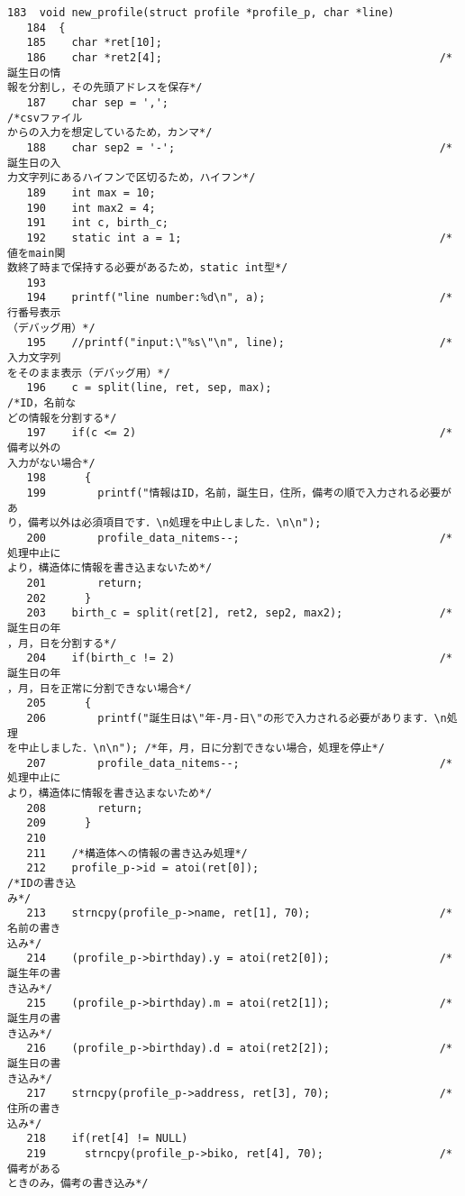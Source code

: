 \begin{Verbatim}[fontsize=\small, baselinestretch=0.8]
   183	void new_profile(struct profile *profile_p, char *line)
   184	{
   185	  char *ret[10];
   186	  char *ret2[4];                                           /*誕生日の情
報を分割し，その先頭アドレスを保存*/
   187	  char sep = ',';                                          /*csvファイル
からの入力を想定しているため，カンマ*/
   188	  char sep2 = '-';                                         /*誕生日の入
力文字列にあるハイフンで区切るため，ハイフン*/
   189	  int max = 10;
   190	  int max2 = 4;
   191	  int c, birth_c;
   192	  static int a = 1;                                        /*値をmain関
数終了時まで保持する必要があるため，static int型*/
   193	  
   194	  printf("line number:%d\n", a);                           /*行番号表示
（デバッグ用）*/
   195	  //printf("input:\"%s\"\n", line);                        /*入力文字列
をそのまま表示（デバッグ用）*/
   196	  c = split(line, ret, sep, max);                          /*ID，名前な
どの情報を分割する*/
   197	  if(c <= 2)                                               /*備考以外の
入力がない場合*/
   198	    {
   199	      printf("情報はID，名前，誕生日，住所，備考の順で入力される必要があ
り，備考以外は必須項目です．\n処理を中止しました．\n\n");
   200	      profile_data_nitems--;                               /*処理中止に
より，構造体に情報を書き込まないため*/
   201	      return;
   202	    }
   203	  birth_c = split(ret[2], ret2, sep2, max2);               /*誕生日の年
，月，日を分割する*/
   204	  if(birth_c != 2)                                         /*誕生日の年
，月，日を正常に分割できない場合*/
   205	    {
   206	      printf("誕生日は\"年-月-日\"の形で入力される必要があります．\n処理
を中止しました．\n\n"); /*年，月，日に分割できない場合，処理を停止*/
   207	      profile_data_nitems--;                               /*処理中止に
より，構造体に情報を書き込まないため*/
   208	      return;
   209	    }
   210	
   211	  /*構造体への情報の書き込み処理*/
   212	  profile_p->id = atoi(ret[0]);                            /*IDの書き込
み*/
   213	  strncpy(profile_p->name, ret[1], 70);                    /*名前の書き
込み*/
   214	  (profile_p->birthday).y = atoi(ret2[0]);                 /*誕生年の書
き込み*/
   215	  (profile_p->birthday).m = atoi(ret2[1]);                 /*誕生月の書
き込み*/
   216	  (profile_p->birthday).d = atoi(ret2[2]);                 /*誕生日の書
き込み*/
   217	  strncpy(profile_p->address, ret[3], 70);                 /*住所の書き
込み*/
   218	  if(ret[4] != NULL)
   219	    strncpy(profile_p->biko, ret[4], 70);                  /*備考がある
ときのみ，備考の書き込み*/

\end{Verbatim}
